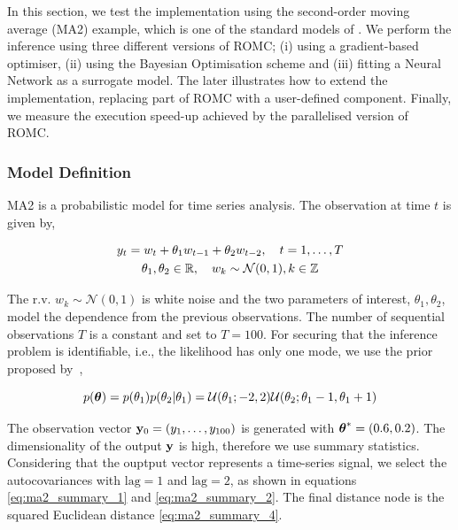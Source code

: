 In this section, we test the implementation using the second-order
moving average (MA2) example, which is one of the standard models of
. We perform the inference using three different versions of
ROMC; (i) using a gradient-based optimiser, (ii) using the Bayesian
Optimisation scheme and (iii) fitting a Neural Network as a surrogate
model. The later illustrates how to extend the implementation,
replacing part of ROMC with a user-defined component. Finally, we
measure the execution speed-up achieved by the parallelised version of
ROMC.

\subsubsection*{Model Definition}

MA2 is a probabilistic model for time series analysis. The observation
at time \(t\) is given by,

\begin{gather} \label{eq:ma2}
y_t = w_t + \theta_1 w_{t-1} + \theta_2 w_{t-2}, \quad t=1, \ldots, T\\
\theta_1, \theta_2 \in \mathbb{R}, \quad  w_k \sim \mathcal{N}(0,1), k \in \mathbb{Z}
\end{gather}

\noindent
The r.v. \(w_{k} \sim \mathcal{N}(0,1) \) is white noise and the two
parameters of interest, \(\theta_1, \theta_2\), model the dependence
from the previous observations. The number of sequential observations
\(T\) is a constant and set to \(T=100\). For securing
that the inference problem is identifiable, i.e., the likelihood has
only one mode, we use the prior proposed by~\cite{Marin2012},

\begin{equation} \label{eq:ma2_prior}
p(\boldsymbol{\theta}) = p(\theta_1)p(\theta_2|\theta_1)
= \mathcal{U}(\theta_1;-2,2)\mathcal{U}(\theta_2;\theta_1-1, \theta_1+1)
\end{equation}

\noindent
The observation vector \(\mathbf{y}_0 = (y_1, \ldots, y_{100})\) is generated
with \(\boldsymbol{\theta}^*=(0.6, 0.2)\). The dimensionality of the output
\(\mathbf{y}\) is high, therefore we use summary statistics. Considering that
the ouptput vector represents a time-series signal, we select the
autocovariances with \(\mathrm{lag}=1\) and \(\mathrm{lag}=2\), as shown in equations
\eqref{eq:ma2_summary_1} and \eqref{eq:ma2_summary_2}. The final
distance node is the squared Euclidean distance
\eqref{eq:ma2_summary_4}.

